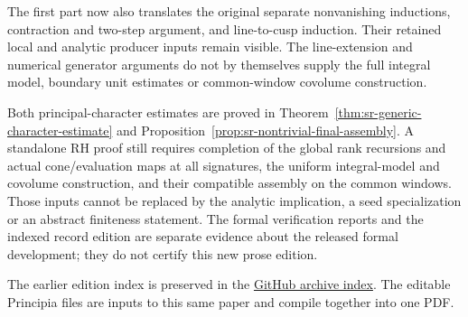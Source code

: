\documentclass[10pt]{article}
\theoremstyle{definition}
\theoremstyle{plain}
\begin{document}
The first part now also translates the original separate
nonvanishing inductions, contraction and two-step argument, and
line-to-cusp induction. Their retained local and analytic producer
inputs remain visible. The line-extension and numerical generator
arguments do not by themselves supply the full integral model,
boundary unit estimates or common-window covolume construction.

Both principal-character estimates are proved in
Theorem~\ref{thm:sr-generic-character-estimate} and
Proposition~\ref{prop:sr-nontrivial-final-assembly}.
A standalone RH proof still requires completion of
the global rank recursions and actual cone/evaluation maps at
all signatures, the uniform integral-model and covolume
construction, and their compatible assembly on the common
windows. Those inputs cannot be replaced by the analytic
implication, a seed specialization or an abstract finiteness
statement. The formal verification reports and the indexed
record edition are separate evidence about the released formal
development; they do not certify this new prose edition.

The earlier edition index is preserved in the
\href{https://github.com/ChristianKudeba/alpoge-rh-verification/blob/main/translation/archive/principia-edition-index-347.md}
{GitHub archive index}.
The editable Principia files are inputs to this same paper and
compile together into one PDF.
\end{document}
